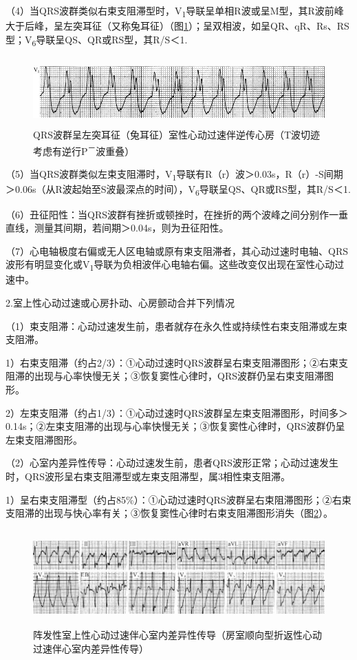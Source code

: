 （4）当QRS波群类似右束支阻滞型时，V\textsubscript{1}导联呈单相R波或呈M型，其R波前峰大于后峰，呈左突耳征（又称兔耳征）（图\ref{fig31-4}）；呈双相波，如呈QR、qR、Rs、RS型；V\textsubscript{6}导联呈QS、QR或RS型，其R/S＜1.

\begin{figure}[!htbp]
 \centering
 \includegraphics[width=5.71875in,height=1.02083in]{./images/Image00507.jpg}
 \captionsetup{justification=centering}
 \caption{QRS波群呈左突耳征（兔耳征）室性心动过速伴逆传心房（T波切迹考虑有逆行P\textsuperscript{－}波重叠）}
 \label{fig31-4}
  \end{figure} 


（5）当QRS波群类似左束支阻滞时，V\textsubscript{1}导联有R（r）波＞0.03s，R（r）-S间期＞0.06s（从R波起始至S波最深点的时间），V\textsubscript{6}导联呈QS、QR或RS型，其R/S＜1.

（6）丑征阳性：当QRS波群有挫折或顿挫时，在挫折的两个波峰之间分别作一垂直线，测量其间期，若间期＞0.04s，则为丑征阳性。

（7）心电轴极度右偏或无人区电轴或原有束支阻滞者，其心动过速时电轴、QRS波形有明显变化或V\textsubscript{1}导联为负相波伴心电轴右偏。这些改变仅出现在室性心动过速中。

2.室上性心动过速或心房扑动、心房颤动合并下列情况

（1）束支阻滞：心动过速发生前，患者就存在永久性或持续性右束支阻滞或左束支阻滞。

1）右束支阻滞（约占2/3）：①心动过速时QRS波群呈右束支阻滞图形；②右束支阻滞的出现与心率快慢无关；③恢复窦性心律时，QRS波群仍呈右束支阻滞图形。

2）左束支阻滞（约占1/3）：①心动过速时QRS波群呈左束支阻滞图形，时间多＞0.14s；②左束支阻滞的出现与心率快慢无关；③恢复窦性心律时，QRS波群仍呈左束支阻滞图形。

（2）心室内差异性传导：心动过速发生前，患者QRS波形正常；心动过速发生时，QRS波形呈右束支阻滞型或左束支阻滞型，属3相性束支阻滞。

1）呈右束支阻滞型（约占85\%）：①心动过速时QRS波群呈右束阻滞图形；②右束支阻滞的出现与快心率有关；③恢复窦性心律时右束支阻滞图形消失（图\ref{fig31-5}）。

\begin{figure}[!htbp]
 \centering
 \includegraphics[width=5.78125in,height=1.44792in]{./images/Image00508.jpg}
 \captionsetup{justification=centering}
 \caption{阵发性室上性心动过速伴心室内差异性传导（房室顺向型折返性心动过速伴心室内差异性传导）}
 \label{fig31-5}
  \end{figure} 

